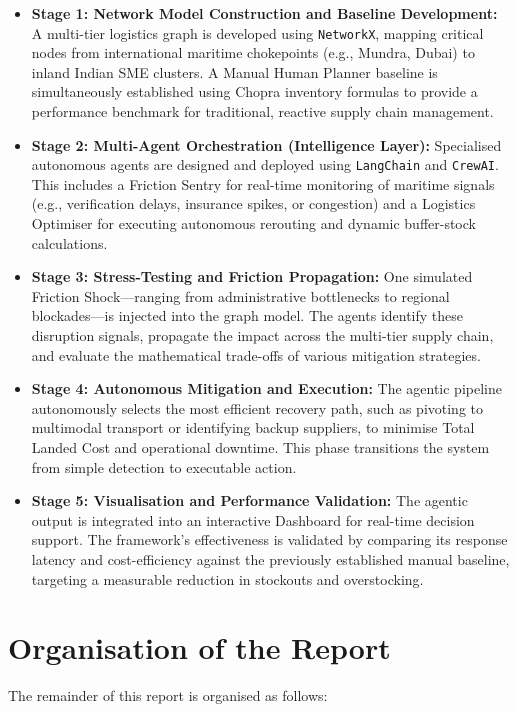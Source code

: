 \begin{itemize}
    \item \textbf{Stage 1: Network Model Construction and Baseline Development:} A multi-tier logistics graph is developed using \texttt{NetworkX}, mapping critical nodes from international maritime chokepoints (e.g., Mundra, Dubai) to inland Indian SME clusters. A Manual Human Planner baseline is simultaneously established using Chopra inventory formulas to provide a performance benchmark for traditional, reactive supply chain management.
    \item \textbf{Stage 2: Multi-Agent Orchestration (Intelligence Layer):} Specialised autonomous agents are designed and deployed using \texttt{LangChain} and \texttt{CrewAI}. This includes a Friction Sentry for real-time monitoring of maritime signals (e.g., verification delays, insurance spikes, or congestion) and a Logistics Optimiser for executing autonomous rerouting and dynamic buffer-stock calculations.
    \item \textbf{Stage 3: Stress-Testing and Friction Propagation:} One simulated Friction Shock---ranging from administrative bottlenecks to regional blockades---is injected into the graph model. The agents identify these disruption signals, propagate the impact across the multi-tier supply chain, and evaluate the mathematical trade-offs of various mitigation strategies.
    \item \textbf{Stage 4: Autonomous Mitigation and Execution:} The agentic pipeline autonomously selects the most efficient recovery path, such as pivoting to multimodal transport or identifying backup suppliers, to minimise Total Landed Cost and operational downtime. This phase transitions the system from simple detection to executable action.
    \item \textbf{Stage 5: Visualisation and Performance Validation:} The agentic output is integrated into an interactive Dashboard for real-time decision support. The framework's effectiveness is validated by comparing its response latency and cost-efficiency against the previously established manual baseline, targeting a measurable reduction in stockouts and overstocking.
\end{itemize}


\section[Organisation of the Report]{\textbf{Organisation of the Report}}
The remainder of this report is organised as follows:

